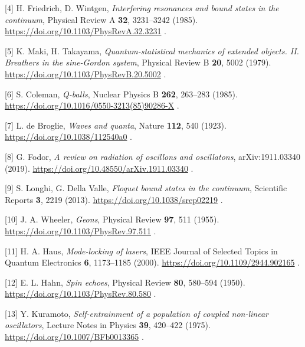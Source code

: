 \documentclass[
  a4paper,
]{article}
\begin{document}
{[}4{]} H. Friedrich, D. Wintgen, \emph{Interfering resonances and bound
states in the continuum}, Physical Review A \textbf{32}, 3231--3242
(1985). \url{https://doi.org/10.1103/PhysRevA.32.3231} .

{[}5{]} K. Maki, H. Takayama, \emph{Quantum-statistical mechanics of
extended objects. II. Breathers in the sine-Gordon system}, Physical
Review B \textbf{20}, 5002 (1979).
\url{https://doi.org/10.1103/PhysRevB.20.5002} .

{[}6{]} S. Coleman, \emph{Q-balls}, Nuclear Physics B \textbf{262},
263--283 (1985). \url{https://doi.org/10.1016/0550-3213(85)90286-X} .

{[}7{]} L. de Broglie, \emph{Waves and quanta}, Nature \textbf{112}, 540
(1923). \url{https://doi.org/10.1038/112540a0} .

{[}8{]} G. Fodor, \emph{A review on radiation of oscillons and
oscillatons}, arXiv:1911.03340 (2019).
\url{https://doi.org/10.48550/arXiv.1911.03340} .

{[}9{]} S. Longhi, G. Della Valle, \emph{Floquet bound states in the
continuum}, Scientific Reports \textbf{3}, 2219 (2013).
\url{https://doi.org/10.1038/srep02219} .

{[}10{]} J. A. Wheeler, \emph{Geons}, Physical Review \textbf{97}, 511
(1955). \url{https://doi.org/10.1103/PhysRev.97.511} .

{[}11{]} H. A. Haus, \emph{Mode-locking of lasers}, IEEE Journal of
Selected Topics in Quantum Electronics \textbf{6}, 1173--1185 (2000).
\url{https://doi.org/10.1109/2944.902165} .

{[}12{]} E. L. Hahn, \emph{Spin echoes}, Physical Review \textbf{80},
580--594 (1950). \url{https://doi.org/10.1103/PhysRev.80.580} .

{[}13{]} Y. Kuramoto, \emph{Self-entrainment of a population of coupled
non-linear oscillators}, Lecture Notes in Physics \textbf{39}, 420--422
(1975). \url{https://doi.org/10.1007/BFb0013365} .
\end{document}
